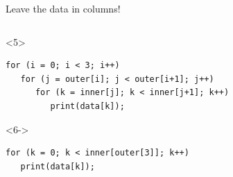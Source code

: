 \documentclass[aspectratio=169]{beamer}
\begin{document}
\begin{frame}[fragile]{Leave the data in columns!}
\begin{columns}[t]
\begin{uncoverenv}
\small
\vspace{-0.25 cm}
\begin{onlyenv}<5>
\begin{verbatim}
for (i = 0; i < 3; i++)
   for (j = outer[i]; j < outer[i+1]; j++)
      for (k = inner[j]; k < inner[j+1]; k++)
         print(data[k]);
\end{verbatim}
\end{onlyenv}
\begin{onlyenv}<6->
\begin{verbatim}
for (k = 0; k < inner[outer[3]]; k++)
   print(data[k]);
\end{verbatim}
\end{onlyenv}
\end{uncoverenv}
\end{columns}

\vspace{0.5 cm}
\end{frame}
\end{document}
